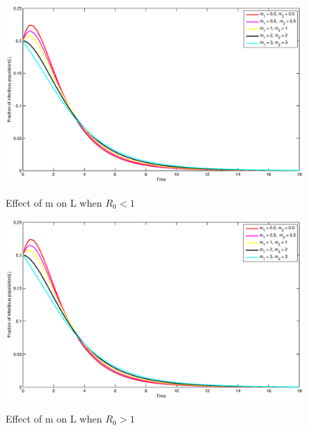 \newpage
\begin{flushleft}
\begin{figure}[h!]
\centering
  \includegraphics[width=7.5in]{mL1.eps}\\
  \caption{Effect of m on L when $R_0<1$}\label{fig:c2}
\end{figure}
\end{flushleft}
\begin{flushleft}
\begin{figure}[h!]
\centering
  \includegraphics[width=7.5in]{mL2.eps}\\
  \caption{Effect of m on L when $R_0>1$}\label{fig:d2}
\end{figure}
\end{flushleft}

